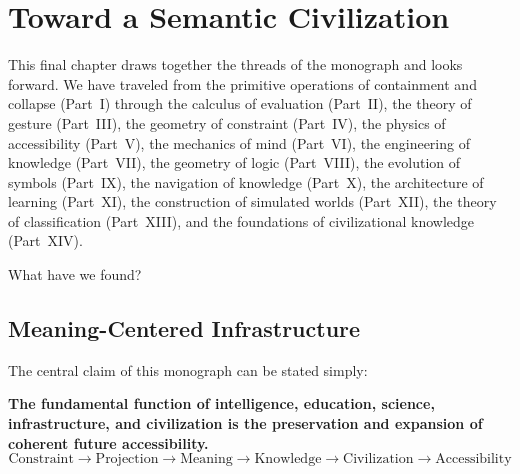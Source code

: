 \chapter{Toward a Semantic Civilization}



This final chapter draws together the threads of the monograph and
looks forward. We have traveled from the primitive operations of
containment and collapse (Part~I) through the calculus of evaluation
(Part~II), the theory of gesture (Part~III), the geometry of constraint
(Part~IV), the physics of accessibility (Part~V), the mechanics of
mind (Part~VI), the engineering of knowledge (Part~VII), the geometry
of logic (Part~VIII), the evolution of symbols (Part~IX), the navigation
of knowledge (Part~X), the architecture of learning (Part~XI), the
construction of simulated worlds (Part~XII), the theory of classification
(Part~XIII), and the foundations of civilizational knowledge (Part~XIV).

What have we found?

\section{Meaning-Centered Infrastructure}

The central claim of this monograph can be stated simply:

\begin{tcolorbox}[enhanced, colback=RSVPdeep, colframe=RSVPdeep,
  coltext=white, arc=6pt, boxrule=0pt, left=8mm, right=8mm, top=6mm, bottom=6mm]
  \textbf{The fundamental function of intelligence, education, science,
  infrastructure, and civilization is the preservation and expansion
  of coherent future accessibility.}
  \[
    \text{Constraint} \to \text{Projection} \to \text{Meaning}
    \to \text{Knowledge} \to \text{Civilization} \to \text{Accessibility}
  \]
\end{tcolorbox}

